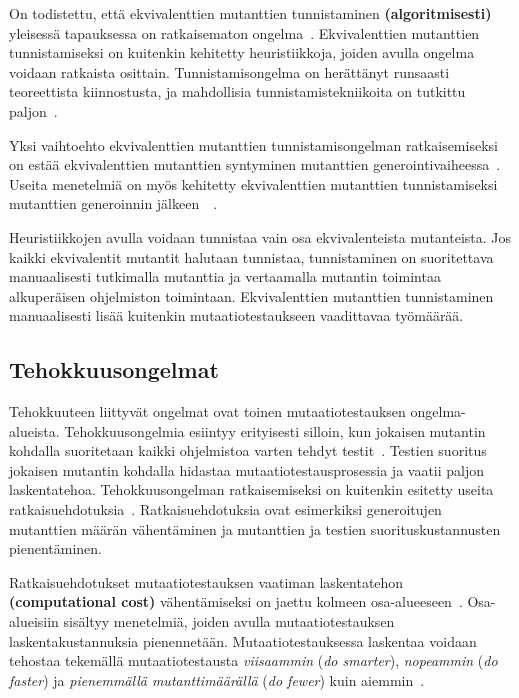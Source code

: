 \documentclass[finnish, grading]{tktltiki2}
\theoremstyle{definition}
\theoremstyle{remark}
\begin{document}
\vspace{1\baselineskip}On todistettu, että ekvivalenttien mutanttien tunnistaminen \textbf{(algoritmisesti)} yleisessä tapauksessa on ratkaisematon ongelma~\cite[s. 79]{Offutt:Ma:Kwon:2006:MuClassLevel}. Ekvivalenttien mutanttien tunnistamiseksi on kuitenkin kehitetty heuristiikkoja, joiden avulla ongelma voidaan ratkaista osittain. Tunnistamisongelma on herättänyt runsaasti teoreettista kiinnostusta, ja mahdollisia tunnistamistekniikoita on tutkittu paljon~\cite[s. 657]{Jia:Harman:2011}. 

Yksi vaihtoehto ekvivalenttien mutanttien tunnistamisongelman ratkaisemiseksi on estää ekvivalenttien mutanttien syntyminen mutanttien generointivaiheessa~\cite[s. 80]{Offutt:Ma:Kwon:2006:MuClassLevel}. Useita menetelmiä on myös kehitetty ekvivalenttien mutanttien tunnistamiseksi mutanttien generoinnin jälkeen~\cite[s. 79]{Offutt:Ma:Kwon:2006:MuClassLevel}~\cite[s. 657]{Jia:Harman:2011}.

Heuristiikkojen avulla voidaan tunnistaa vain osa ekvivalenteista mutanteista. Jos kaikki ekvivalentit mutantit halutaan tunnistaa, tunnistaminen on suoritettava manuaalisesti tutkimalla mutanttia ja vertaamalla mutantin toimintaa alkuperäisen ohjelmiston toimintaan. Ekvivalenttien mutanttien tunnistaminen manuaalisesti lisää kuitenkin mutaatiotestaukseen vaadittavaa työmäärää.

\subsection{Tehokkuusongelmat}

Tehokkuuteen liittyvät ongelmat ovat toinen mutaatiotestauksen ongelma-alueista. Tehokkuusongelmia esiintyy erityisesti silloin, kun jokaisen mutantin kohdalla suoritetaan kaikki ohjelmistoa varten tehdyt testit~\cite[s. 652]{Jia:Harman:2011}. Testien suoritus jokaisen mutantin kohdalla hidastaa mutaatiotestausprosessia ja vaatii paljon laskentatehoa. Tehokkuusongelman ratkaisemiseksi on kuitenkin esitetty useita ratkaisuehdotuksia~\cite[s. 653]{Jia:Harman:2011}. Ratkaisuehdotuksia ovat esimerkiksi generoitujen mutanttien määrän vähentäminen ja mutanttien ja testien suorituskustannusten pienentäminen.

Ratkaisuehdotukset mutaatiotestauksen vaatiman laskentatehon \textbf{(computational cost)} vähentämiseksi on jaettu kolmeen osa-alueeseen~\cite[s. 37]{Offutt:Untch:2001}. Osa-alueisiin sisältyy menetelmiä, joiden avulla mutaatiotestauksen laskentakustannuksia pienennetään. Mutaatiotestauksessa laskentaa voidaan tehostaa tekemällä mutaatiotestausta \textit{viisaammin} (\textit{do smarter}), \textit{nopeammin} (\textit{do faster}) ja \textit{pienemmällä mutanttimäärällä} (\textit{do fewer}) kuin aiemmin~\cite[s. 37]{Offutt:Untch:2001}.
\end{document}
